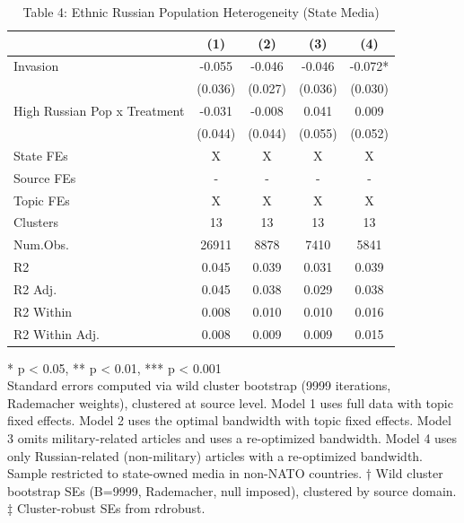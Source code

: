 \begin{table}[!t]
\caption{Table 4: Ethnic Russian Population Heterogeneity (State Media)} 
\fontsize{12.0pt}{14.4pt}\selectfont
\begin{tabular*}{\linewidth}{@{\extracolsep{\fill}}lcccc}
\toprule
  & (1) & (2) & (3) & (4) \\ 
\midrule\addlinespace[2.5pt]
Invasion & -0.055 & -0.046 & -0.046 & -0.072* \\ 
 & (0.036) & (0.027) & (0.036) & (0.030) \\ 
High Russian Pop x Treatment & -0.031 & -0.008 & 0.041 & 0.009 \\ 
{} & {(0.044)} & {(0.044)} & {(0.055)} & {(0.052)} \\ 
State FEs & X & X & X & X \\ 
Source FEs & - & - & - & - \\ 
Topic FEs & X & X & X & X \\ 
Clusters & 13 & 13 & 13 & 13 \\ 
Num.Obs. & 26911 & 8878 & 7410 & 5841 \\ 
R2 & 0.045 & 0.039 & 0.031 & 0.039 \\ 
R2 Adj. & 0.045 & 0.038 & 0.029 & 0.038 \\ 
R2 Within & 0.008 & 0.010 & 0.010 & 0.016 \\ 
R2 Within Adj. & 0.008 & 0.009 & 0.009 & 0.015 \\ 
\bottomrule
\end{tabular*}
\begin{minipage}{\linewidth}
* p < 0.05, ** p < 0.01, *** p < 0.001\\
Standard errors computed via wild cluster bootstrap (9999 iterations, Rademacher
weights), clustered at source level. Model 1 uses full data with topic fixed
effects. Model 2 uses the optimal bandwidth with topic fixed effects. Model 3
omits military-related articles and uses a re-optimized bandwidth. Model 4 uses
only Russian-related (non-military) articles with a re-optimized bandwidth.
Sample restricted to state-owned media in non-NATO countries. † Wild cluster
bootstrap SEs (B=9999, Rademacher, null imposed), clustered by source domain. ‡
Cluster-robust SEs from rdrobust.\\
\end{minipage}
\end{table}

